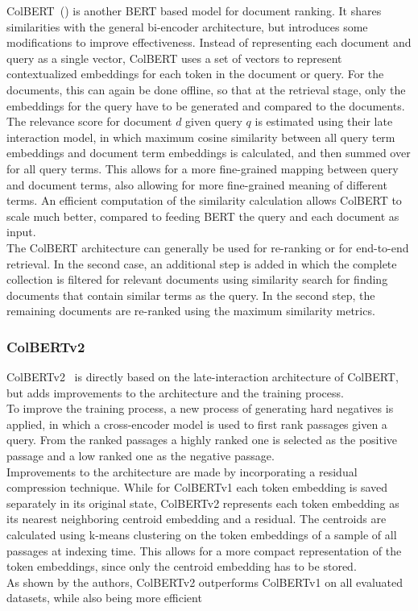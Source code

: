 ColBERT~(\cite{khattab:2020:Colbert}) is another BERT based model for document ranking.
It shares similarities with the general bi-encoder architecture, but introduces some modifications to improve effectiveness.
Instead of representing each document and query as a single vector, ColBERT uses a set of vectors to represent contextualized embeddings for each token in the document or query.
For the documents, this can again be done offline, so that at the retrieval stage, only the embeddings for the query have to be generated and compared to the documents.
The relevance score for document $d$ given query $q$ is estimated using their late interaction model, in which maximum cosine similarity between all query term embeddings and document term embeddings is calculated, and then summed over for all query terms.
This allows for a more fine-grained mapping between query and document terms, also allowing for more fine-grained meaning of different terms.
An efficient computation of the similarity calculation allows ColBERT to scale much better, compared to feeding BERT the query and each document as input.
\\
The ColBERT architecture can generally be used for re-ranking or for end-to-end retrieval.
In the second case, an additional step is added in which the complete collection is filtered for relevant documents using similarity search for finding documents that contain similar terms as the query.
In the second step, the remaining documents are re-ranked using the maximum similarity metrics.
\\
\subsubsection{ColBERTv2}\label{sec:colbertv2}
ColBERTv2~\citep{santhanam:2021:Colbertv2} is directly based on the late-interaction architecture of ColBERT, but adds improvements to the architecture and the training process.
\\
To improve the training process, a new process of generating hard negatives is applied, in which a cross-encoder model is used to first rank passages given a query.
From the ranked passages a highly ranked one is selected as the positive passage and a low ranked one as the negative passage.
\\
Improvements to the architecture are made by incorporating a residual compression technique.
While for ColBERTv1 each token embedding is saved separately in its original state, ColBERTv2 represents each token embedding as its nearest neighboring centroid embedding and a residual.
The centroids are calculated using k-means clustering on the token embeddings of a sample of all passages at indexing time. 
This allows for a more compact representation of the token embeddings, since only the centroid embedding has to be stored.
\\
As shown by the authors, ColBERTv2 outperforms ColBERTv1 on all evaluated datasets, while also being more efficient

